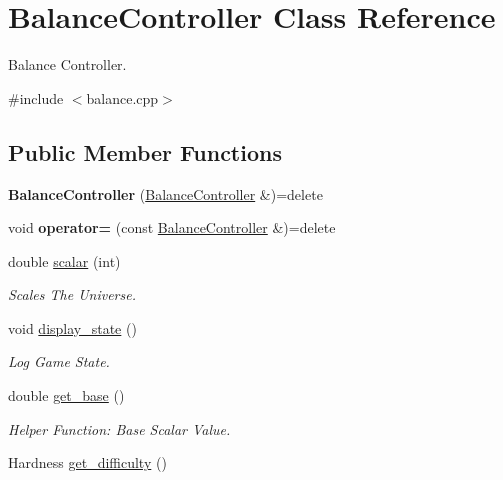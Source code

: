 \hypertarget{classBalanceController}{}\section{Balance\+Controller Class Reference}
\label{classBalanceController}


Balance Controller.  




{\ttfamily \#include $<$balance.\+cpp$>$}

\subsection*{Public Member Functions}
\begin{DoxyCompactItemize}
\item 
\mbox{\label{classBalanceController_ad03029a693705a0adc90bd6cc426aa96}} 
{\bfseries Balance\+Controller} (\mbox{\hyperlink{classBalanceController}{Balance\+Controller}} \&)=delete
\item 
\mbox{\label{classBalanceController_af8b3ab3ca188003176f33161800c7991}} 
void {\bfseries operator=} (const \mbox{\hyperlink{classBalanceController}{Balance\+Controller}} \&)=delete
\item 
double \mbox{\hyperlink{classBalanceController_a89402d9a7abd85a4fa522f3ad642b6ce}{scalar}} (int)
\begin{DoxyCompactList}\small\item\em Scales The Universe. \end{DoxyCompactList}\item 
void \mbox{\hyperlink{classBalanceController_a13eb2d765e0aa528b131b32dd1940fac}{display\+\_\+state}} ()
\begin{DoxyCompactList}\small\item\em Log Game State. \end{DoxyCompactList}\item 
double \mbox{\hyperlink{classBalanceController_a68f4371ae68f48c5040906949cab77b4}{get\+\_\+base}} ()
\begin{DoxyCompactList}\small\item\em Helper Function\+: Base Scalar Value. \end{DoxyCompactList}\item 
Hardness \mbox{\hyperlink{classBalanceController_ab533d0f17d9e616c208049dc318a9dc8}{get\+\_\+difficulty}} ()

\end{DoxyCompactItemize}
